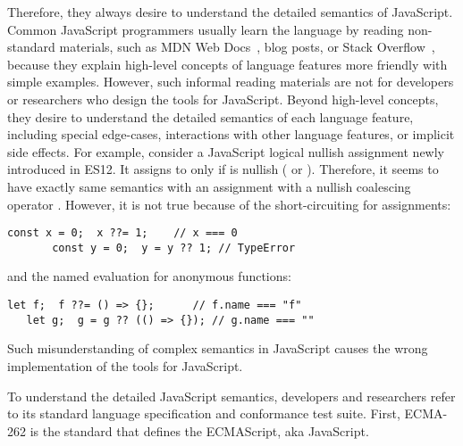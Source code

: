 Therefore, they always desire to understand the detailed semantics of
JavaScript.  Common JavaScript programmers usually learn the language by reading
non-standard materials, such as MDN Web Docs~\cite{mdn-doc}, blog posts, or
Stack Overflow~\cite{stackoverflow}, because they explain high-level concepts of
language features more friendly with simple examples.  However, such informal
reading materials are not for developers or researchers who design the tools for
JavaScript.  Beyond high-level concepts, they desire to understand the detailed
semantics of each language feature, including special edge-cases, interactions
with other language features, or implicit side effects.  For example, consider a
JavaScript logical nullish assignment  newly introduced in ES12.
It assigns  to  only if  is nullish
( or ). Therefore, it seems to have exactly same
semantics with an assignment  with a nullish coalescing
operator .  However, it is not true because of the short-circuiting
for assignments:
\begin{lstlisting}[style=JS]
       const x = 0;  x ??= 1;    // x === 0
       const y = 0;  y = y ?? 1; // TypeError
\end{lstlisting}
and the named evaluation for anonymous functions:
\begin{lstlisting}[style=JS]
   let f;  f ??= () => {};      // f.name === "f"
   let g;  g = g ?? (() => {}); // g.name === ""
\end{lstlisting}
Such misunderstanding of complex semantics in JavaScript causes the wrong
implementation of the tools for JavaScript.

To understand the detailed JavaScript semantics, developers and researchers
refer to its standard language specification and conformance test suite.  First,
ECMA-262 is the standard that defines the ECMAScript, aka JavaScript.





